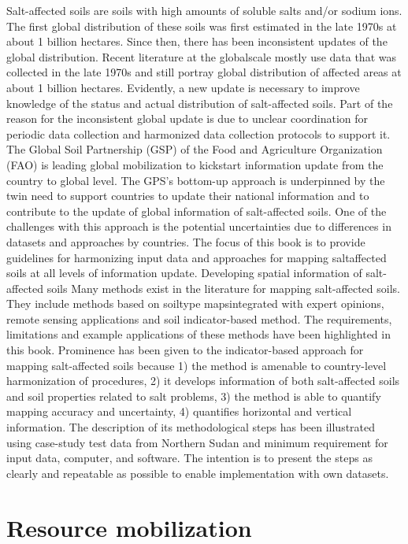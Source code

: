 \documentclass[
  10pt,
  b5paper,
]{book}
\begin{document}
Salt-affected soils are soils with high amounts of soluble salts and/or sodium ions. The first global
distribution of these soils was first estimated in the late 1970s at about 1 billion hectares. Since then,
there has been inconsistent updates of the global distribution. Recent literature at the globalscale mostly
use data that was collected in the late 1970s and still portray global distribution of affected areas at about
1 billion hectares. Evidently, a new update is necessary to improve knowledge of the status and actual
distribution of salt-affected soils. Part of the reason for the inconsistent global update is due to unclear
coordination for periodic data collection and harmonized data collection protocols to support it. The
Global Soil Partnership (GSP) of the Food and Agriculture Organization (FAO) is leading global
mobilization to kickstart information update from the country to global level. The GPS's bottom-up
approach is underpinned by the twin need to support countries to update their national information and
to contribute to the update of global information of salt-affected soils. One of the challenges with this
approach is the potential uncertainties due to differences in datasets and approaches by countries. The
focus of this book is to provide guidelines for harmonizing input data and approaches for mapping saltaffected soils at all levels of information update.
Developing spatial information of salt-affected soils
Many methods exist in the literature for mapping salt-affected soils. They include methods based on soiltype mapsintegrated with expert opinions, remote sensing applications and soil indicator-based method.
The requirements, limitations and example applications of these methods have been highlighted in this
book. Prominence has been given to the indicator-based approach for mapping salt-affected soils
because 1) the method is amenable to country-level harmonization of procedures, 2) it develops
information of both salt-affected soils and soil properties related to salt problems, 3) the method is able
to quantify mapping accuracy and uncertainty, 4) quantifies horizontal and vertical information. The
description of its methodological steps has been illustrated using case-study test data from Northern
Sudan and minimum requirement for input data, computer, and software. The intention is to present the
steps as clearly and repeatable as possible to enable implementation with own datasets.

\hypertarget{resource-mobilization}{%
\section*{Resource mobilization}\label{resource-mobilization}}
\end{document}
